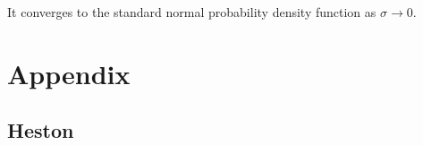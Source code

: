 \documentclass[11pt,a4,twosided,singlespacing,titlepagenumber=on]{scrreprt}
\numberwithin{equation}{chapter} %
\theoremstyle{remark}
\begin{document}
It converges to the standard normal probability density function as $\sigma \rightarrow 0$.


\cleardoublepage
{}
{} %




\chapter{Appendix}

\section{Heston}
\end{document}
